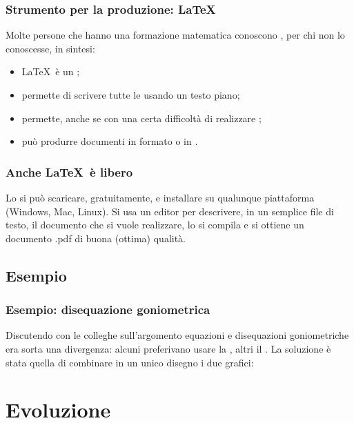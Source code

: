 \documentclass{beamer} %
\begin{document}
\begin{frame}\frametitle{Strumento per la produzione: \LaTeX}

Molte persone che hanno una formazione matematica conoscono 
\orange{\LaTeX}, per chi non lo conoscesse, in sintesi:
\begin{itemize} %
\item \LaTeX\ è un ; 
\item permette di scrivere tutte le  usando un testo piano;
\item permette, anche se con una certa difficoltà di realizzare 
;
\item può produrre documenti in formato  o 
in .
\end{itemize}

\end{frame}


\begin{frame}\frametitle{Anche \LaTeX\ è libero}

Lo si può scaricare, gratuitamente, e installare 
su qualunque piattaforma (Windows, Mac, Linux).
\spause
Si usa un editor per descrivere, in un semplice file di testo, 
il documento che si vuole realizzare, lo si compila e si ottiene un 
documento .pdf di buona (ottima) qualità.

\end{frame}


\subsection{Esempio} 

\begin{frame}\frametitle{Esempio: disequazione goniometrica}

Discutendo con le colleghe sull'argomento equazioni e 
disequazioni goniometriche era sorta una divergenza: alcuni preferivano 
usare la , 
altri il .
\spause
La soluzione è stata quella di combinare in un unico disegno i due grafici: 

\begin{center}
\disequazionegon
\end{center}

\end{frame}


\section{Evoluzione}
\end{document}
